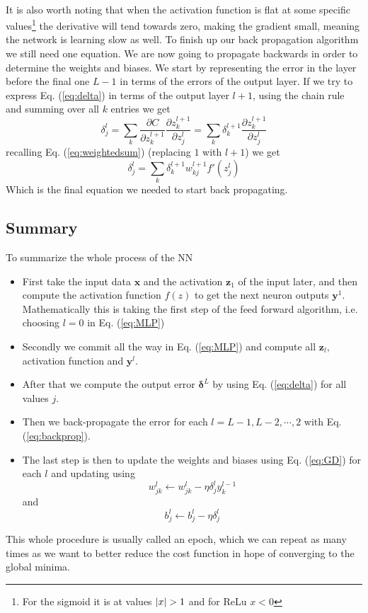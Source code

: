 \documentclass[12pt, a4paper]{book}
\begin{document}
\\It is also worth noting that when the activation function is flat at some specific values\footnote{For the sigmoid it is at values $\abs{x}>1$ and for ReLu $x<0$} the derivative will tend towards zero, making the gradient small, 
meaning the network is learning slow as well. To finish up our back propagation algorithm we still need one equation. We are now going to propagate backwards in order to determine the weights and biases. 
We start by representing the error in the layer before the final one $L-1$ in terms of the errors of the output layer. If we try to express Eq. (\ref{eq:delta}) in terms of the output layer $l+1$, 
using the chain rule and summing over all $k$ entries we get
$$
\delta_j^l=\sum_k\frac{\partial C}{\partial z_k^{l+1}}\frac{\partial z_k^{l+1}}{\partial z_j^l} =\sum_k \delta_k^{l+1}\frac{\partial z_k^{l+1}}{\partial z_j^l}
$$
recalling Eq. (\ref{eq:weightedsum}) (replacing $1$ with $l+1$) we get
\begin{equation}\label{eq:backprop}
    \delta_j^l=\sum_k\delta_k^{l+1}w_{kj}^{l+1}f'(z_j^l)
\end{equation}
Which is the final equation we needed to start back propagating. 

\subsection{Summary}
To summarize the whole process of the NN
\begin{itemize}
    \item First take the input data $\mathbf{x}$ and the activation $\mathbf{z}_1$ of the input later, and then compute the activation function $f(z)$ to get the next neuron outputs $\mathbf{y}^1$. 
    Mathematically this is taking the first step of the feed forward algorithm, i.e. choosing $l=0$ in Eq. (\ref{eq:MLP})
    \item Secondly we commit all the way in Eq. (\ref{eq:MLP}) and compute all $\mathbf{z}_l$, activation function and $\mathbf{y}^l$.
    \item After that we compute the output error $\bm{\delta}^L$ by using Eq. (\ref{eq:delta}) for all values $j$.
    \item Then we back-propagate the error for each $l=L-1,L-2,\cdots,2$ with Eq. (\ref{eq:backprop}).
    \item The last step is then to update the weights and biases using Eq. (\ref{eq:GD}) for each $l$ and updating using
    $$
    w_{jk}^l\leftarrow w_{jk}^l-\eta\delta_j^ly_k^{l-1}
    $$
    and
    $$
    b_j^l \leftarrow b_j^l-\eta\delta_j^l
    $$
\end{itemize}
This whole procedure is usually called an epoch, which we can repeat as many times as we want to better reduce the cost function in hope of converging to the global minima.
\end{document}

